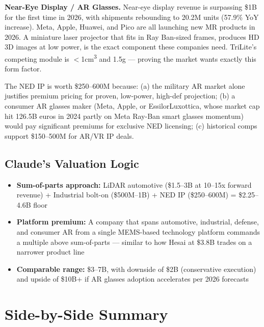 \documentclass[11pt,letterpaper]{article}
\begin{document}
\textbf{Near-Eye Display / AR Glasses.}
Near-eye display revenue is surpassing \$1B for the first time in 2026, with shipments rebounding to 20.2M units (57.9\% YoY increase). Meta, Apple, Huawei, and Pico are all launching new MR products in 2026. A miniature laser projector that fits in Ray Ban-sized frames, produces HD 3D images at low power, is the exact component these companies need. TriLite's competing module is $<$1cm\textsuperscript{3} and 1.5g --- proving the market wants exactly this form factor.

The NED IP is worth \$250--600M because: (a) the military AR market alone justifies premium pricing for proven, low-power, high-def projection; (b) a consumer AR glasses maker (Meta, Apple, or EssilorLuxottica, whose market cap hit 126.5B euros in 2024 partly on Meta Ray-Ban smart glasses momentum) would pay significant premiums for exclusive NED licensing; (c) historical comps support \$150--500M for AR/VR IP deals.

\subsection{Claude's Valuation Logic}

\begin{itemize}
\item \textbf{Sum-of-parts approach:} LiDAR automotive (\$1.5--3B at 10--15x forward revenue) + Industrial bolt-on (\$500M--1B) + NED IP (\$250--600M) = \$2.25--4.6B floor
\item \textbf{Platform premium:} A company that spans automotive, industrial, defense, and consumer AR from a single MEMS-based technology platform commands a multiple above sum-of-parts --- similar to how Hesai at \$3.8B trades on a narrower product line
\item \textbf{Comparable range:} \$3--7B, with downside of \$2B (conservative execution) and upside of \$10B+ if AR glasses adoption accelerates per 2026 forecasts
\end{itemize}

\section{Side-by-Side Summary}
\end{document}
